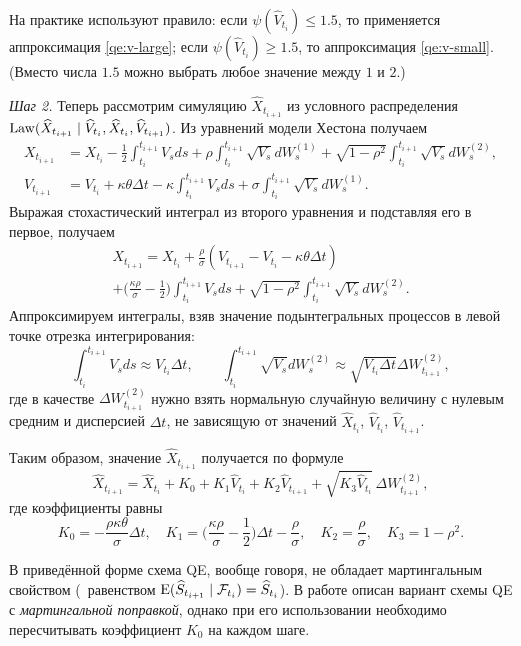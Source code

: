 На практике используют правило: если $\psi(\hat V_{t_i}) \le 1.5$, то применяется аппроксимация \eqref{qe:v-large}; если $\psi(\hat V_{t_i}) \ge 1.5$, то аппроксимация \eqref{qe:v-small}. (Вместо числа $1.5$ можно выбрать любое значение между $1$ и $2$.)

\textit{Шаг 2.} Теперь рассмотрим симуляцию $\hat X_{t_{i+1}}$ из условного распределения $\operatorname{Law} (\widehat X_{t_{i+1}} \mid \widehat V_{t_i}, \widehat X_{t_i}, \widehat V_{t_{i+1}})$.
Из уравнений модели Хестона получаем
\begin{align*}
X_{t_{i+1}} &= X_{t_i} - \frac12 \int_{t_i}^{t_{i+1}} V_s ds 
  + \rho\int_{t_i}^{t_{i+1}} \sqrt{V_s} d W_s^{(1)} 
  + \sqrt{1-\rho^2} \int_{t_i}^{t_{i+1}} \sqrt{V_s} d W_s^{(2)},\\
V_{t_{i+1}} &= V_{t_i} + \kappa\theta\Delta t - \kappa\int_{t_i}^{t_{i+1}} V_s ds 
  + \sigma \int_{t_i}^{t_{i+1}} \sqrt{V_s} d W_s^{(1)}.
\end{align*}
Выражая стохастический интеграл из второго уравнения и подставляя его в первое, получаем
\begin{multline*}
X_{t_{i+1}} = X_{t_i} 
  + \frac{\rho}{\sigma} (V_{t_{i+1}} - V_{t_i} - \kappa\theta\Delta t) \\
+ \biggl(\frac{\kappa\rho}{\sigma} - \frac12\biggr) 
  \int_{t_i}^{t_{i+1}} V_s ds 
+ \sqrt{1-\rho^2} \int_{t_i}^{t_{i+1}} \sqrt{V_s} d W_s^{(2)}.
\end{multline*}
Аппроксимируем интегралы, взяв значение подынтегральных процессов в левой точке отрезка интегрирования:
\[
\int_{t_i}^{t_{i+1}} V_s ds \approx V_{t_i} \Delta t, \qquad
\int_{t_i}^{t_{i+1}} \sqrt{V_s} d W^{(2)}_s \approx \sqrt{V_{t_i} \Delta t} \Delta W_{t_{i+1}}^{(2)},
\]
где в качестве $\Delta W_{t_{i+1}}^{(2)}$ нужно взять нормальную случайную величину с нулевым средним и дисперсией $\Delta t$, не зависящую от значений $\hat X_{t_i}$, $\hat V_{t_i}$, $\hat V_{t_{i+1}}$.

Таким образом, значение  $\hat X_{t_{i+1}}$ получается по формуле
\[
\hat X_{t_{i+1}} = \hat X_{t_i} + K_0 + K_1 \hat V_{t_i} 
+ K_2 \hat V_{t_{i+1}} + \sqrt{K_3 \hat V_{t_i}} \,\Delta W_{t_{i+1}}^{(2)},
\]
где коэффициенты равны
\[
K_0 = -\frac{\rho\kappa\theta}{\sigma} \Delta t, \quad 
K_1 = \biggl(\frac{\kappa\rho}{\sigma} - \frac12\biggr)\Delta t - \frac{\rho}{\sigma}, \quad
K_2 = \frac{\rho}{\sigma}, \quad
K_3 = 1-\rho^2.
\]

\begin{remark}
В приведённой форме схема QE, вообще говоря, не обладает мартингальным свойством (\te\ равенством $\operatorname{E}(\widehat S_{t_{i+1}} \mid \mathcal{F}_{t_i}) = \widehat S_{t_i}$).
В работе \cite{Andersen08} описан вариант схемы QE с \emph{мартингальной поправкой}, однако при его использовании необходимо пересчитывать коэффициент $K_0$ на каждом шаге.
\end{remark}

